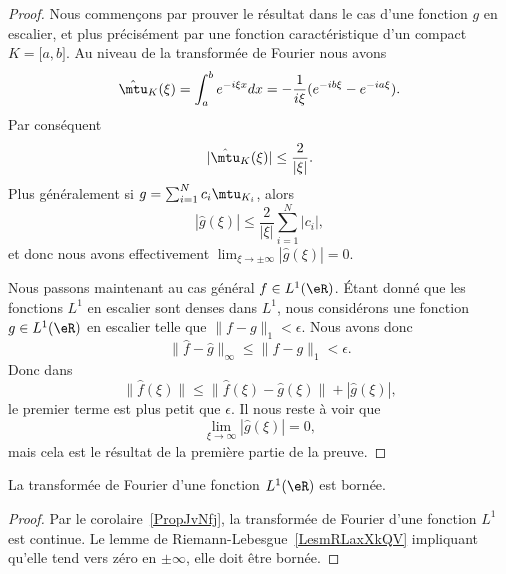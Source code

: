 \begin{proof}
	Nous commençons par prouver le résultat dans le cas d'une fonction \( g\) en escalier, et plus précisément par une fonction caractéristique d'un compact \( K=\mathopen[ a , b \mathclose]\). Au niveau de la transformée de Fourier nous avons
	\begin{equation}
		\hat\mtu_{K}(\xi)=\int_a^b e^{-i\xi x}dx=-\frac{1}{ i\xi }( e^{-ib\xi}- e^{-ia\xi}).
	\end{equation}
	Par conséquent
	\begin{equation}
		| \hat\mtu_K(\xi) |\leq \frac{ 2 }{ | \xi | }.
	\end{equation}
	Plus généralement si \( g=\sum_{i=1}^Nc_i\mtu_{K_i}\), alors
	\begin{equation}
		| \hat g(\xi) |\leq \frac{ 2 }{ | \xi | }\sum_{i=1}^N| c_i |,
	\end{equation}
	et donc nous avons effectivement \( \lim_{\xi\to\pm\infty}| \hat g(\xi) |=0\).

	Nous passons maintenant au cas général \( f\in L^1(\eR)\). Étant donné que les fonctions \( L^1\) en escalier sont denses dans \( L^1\), nous considérons une fonction \( g\in L^1(\eR)\) en escalier telle que \( \| f-g \|_1<\epsilon\). Nous avons donc
	\begin{equation}
		\| \hat f-\hat g \|_{\infty}\leq \| f-g \|_1<\epsilon.
	\end{equation}
	Donc dans
	\begin{equation}
		\| \hat f(\xi) \|\leq \| \hat f(\xi)-\hat g(\xi) \|+| \hat g(\xi) |,
	\end{equation}
	le premier terme est plus petit que \( \epsilon\). Il nous reste à voir que
	\begin{equation}
		\lim_{\xi\to \infty} | \hat g(\xi) |=0,
	\end{equation}
	mais cela est le résultat de la première partie de la preuve.
\end{proof}

\begin{corollary}       \label{CORooHSNYooZlZoyV}
	La transformée de Fourier d'une fonction \( L^1(\eR)\) est bornée.
\end{corollary}

\begin{proof}
	Par le corolaire~\ref{PropJvNfj}, la transformée de Fourier d'une fonction \( L^1\) est continue. Le lemme de Riemann-Lebesgue~\ref{LesmRLaxXkQV} impliquant qu'elle tend vers zéro en \( \pm\infty\), elle doit être bornée.
\end{proof}

